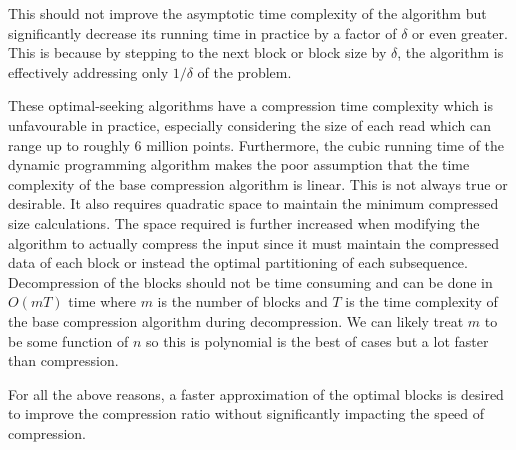 

This should not improve the asymptotic time complexity of the algorithm but
significantly decrease its running time in practice by a factor of $\delta$ or
even greater.
This is because by stepping to the next block or block size by $\delta$, the
algorithm is effectively addressing only $1/\delta$ of the problem.

These optimal-seeking algorithms have a compression time complexity which is
unfavourable in practice, especially considering the size of each read which can
range up to roughly 6 million points.
Furthermore, the cubic running time of the dynamic programming algorithm makes
the poor assumption that the time complexity of the base compression algorithm
is linear. This is not always true or desirable.
It also requires quadratic space to maintain the minimum compressed size
calculations. The space required is further increased when modifying the
algorithm to actually compress the input since
it must maintain the compressed data of each block or instead the optimal
partitioning of each subsequence. Decompression of the blocks
should not be time consuming and can be done in $O(mT)$ time where $m$ is the
number of blocks and $T$ is the time complexity of the base compression
algorithm during decompression. We can likely treat $m$ to be some function of
$n$ so this is polynomial is the best of cases but a lot faster than compression.

For all the above reasons, a faster approximation of the optimal blocks is
desired to improve the compression ratio without significantly impacting the speed of
compression.
